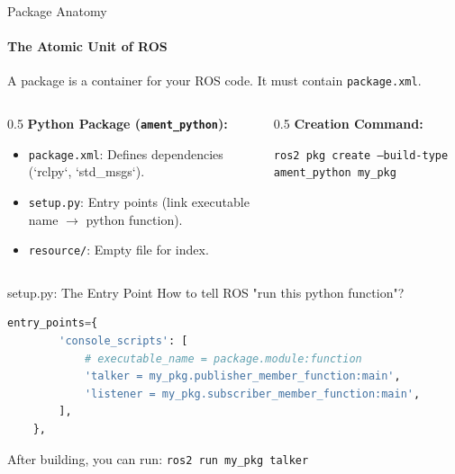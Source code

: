 \documentclass[aspectratio=169]{beamer}
\newcommand{\dbox}[1]{
\begin{mdframed}[roundcorner=3pt, backgroundcolor=yellow, linewidth=0]
\vspace{1mm}
{#1}
\vspace{1mm}
\end{mdframed}
}
\begin{document}
\begin{frame}[t]{Package Anatomy}
    \framesubtitle{The Atomic Unit of ROS}
    A package is a container for your ROS code. It must contain \texttt{package.xml}.
    
    \begin{columns}
        \begin{column}{0.5\textwidth}
            \textbf{Python Package (\texttt{ament\_python}):}
            \begin{itemize}
                \item \texttt{package.xml}: Defines dependencies (`rclpy`, `std\_msgs`).
                \item \texttt{setup.py}: Entry points (link executable name $\to$ python function).
                \item \texttt{resource/}: Empty file for index.
            \end{itemize}
        \end{column}
        \begin{column}{0.5\textwidth}
            \textbf{Creation Command:}
            \vspace{0.5em}
            \dbox{\scriptsize \texttt{ros2 pkg create --build-type ament\_python my\_pkg}}
        \end{column}
    \end{columns}
\end{frame}

\begin{frame}[fragile]{setup.py: The Entry Point}
    How to tell ROS "run this python function"?
    \scriptsize
\begin{lstlisting}[language=Python]
    entry_points={
        'console_scripts': [
            # executable_name = package.module:function
            'talker = my_pkg.publisher_member_function:main',
            'listener = my_pkg.subscriber_member_function:main',
        ],
    },
\end{lstlisting}
    \normalsize
    After building, you can run: \texttt{ros2 run my\_pkg talker}
\end{frame}
\end{document}
